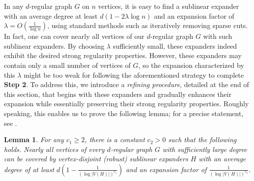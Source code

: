 \documentclass[10pt]{article}
\theoremstyle{plain}
\numberwithin{theorem}{section}
\newtheorem{lemma}[theorem]{Lemma}
\theoremstyle{definition}
\theoremstyle{remark}
\theoremstyle{plain}
\begin{document}
In any $d$-regular graph $G$ on $n$ vertices, it is easy to find a sublinear expander with an average degree at least $d(1 - 2\lambda \log n)$ and an expansion factor of $\lambda = O\left(\frac{1}{\log n}\right)$, using standard methods such as iteratively removing sparse cuts. In fact, one can cover nearly all vertices of our $d$-regular graph $G$ with such sublinear expanders. By choosing $\lambda$ sufficiently small, these expanders indeed exhibit the desired strong regularity properties. However, these expanders may contain only a small number of vertices of $G$, so the expansion characterized by this $\lambda$ might be too weak for following the aforementioned strategy to complete \textbf{Step 2}. To address this, we introduce a \emph{refining procedure}, detailed at the end of this section, that begins with these expanders and gradually enhances their expansion while essentially preserving their strong regularity properties. Roughly speaking, this enables us to prove the following lemma; for a precise statement, see .

\begin{lemma}
\label{refininglemma}
For any $c_1 \ge 2$, there is a constant $c_2 > 0$ such that the following holds. Nearly all vertices of every $d$-regular graph $G$ with sufficiently large degree can be covered by vertex-disjoint (robust) sublinear expanders $H$ with an average degree of at least $d(1 - \frac{1}{(\log |V(H)|)^{c_1}})$ and an expansion factor of $\frac{1}{(\log |V(H)|)^{c_2}}$.
\end{lemma}
\end{document}
